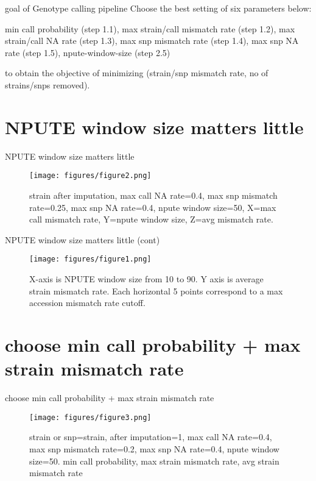 \documentclass{beamer}
\begin{document}
\begin{frame}{goal of Genotype calling pipeline}
Choose the best setting of six parameters below:

min call probability (step 1.1), max strain/call mismatch rate (step 1.2), max strain/call NA rate (step 1.3), max snp mismatch rate (step 1.4), max snp NA rate (step 1.5), npute-window-size (step 2.5)

to obtain the objective of minimizing (strain/snp mismatch rate, no of strains/snps removed).
\end{frame}

\section{NPUTE window size matters little}
\begin{frame}{NPUTE window size matters little}

\begin{figure}
\texttt{[image: figures/figure2.png]}
\caption{strain after imputation, max call NA rate=0.4, max snp mismatch rate=0.25, max snp NA rate=0.4, npute window size=50, X=max call mismatch rate, Y=npute window size, Z=avg mismatch rate.}\label{f2}
\end{figure}

\end{frame}

\begin{frame}{NPUTE window size matters little (cont)}
\begin{figure}
\texttt{[image: figures/figure1.png]}
\caption{X-axis is NPUTE window size from 10 to 90. Y axis is average strain mismatch rate. Each horizontal 5 points correspond to a max accession mismatch rate cutoff.}\label{f1}
\end{figure}
\end{frame}

\section{choose min call probability + max strain mismatch rate}
\begin{frame}{choose min call probability + max strain mismatch rate}

\begin{figure}
\texttt{[image: figures/figure3.png]}
\caption{strain or snp=strain, after imputation=1, max call NA rate=0.4, max snp mismatch rate=0.2, max snp NA rate=0.4, npute window size=50. min call probability, max strain mismatch rate, avg strain mismatch rate}\label{f3}
\end{figure}
\end{frame}
\end{document}
